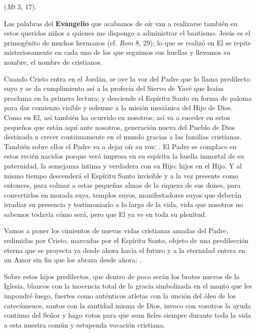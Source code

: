 				\begin{body}
					 (\emph{Mt} 3, 17).
					
					Las palabras del \textbf{Evangelio} que acabamos de oír van a realizarse también en estos queridos niños a quienes me dispongo a administrar el bautismo. Jesús es el primogénito de muchos hermanos (cf. \emph{Rom} 8, 29); lo que se realizó en El se repite misteriosamente en cada uno de los que seguimos sus huellas y llevamos su nombre, el nombre de cristianos.
					
					Cuando Cristo entra en el Jordán, se oye la voz del Padre que lo llama predilecto suyo y se da cumplimiento así a la profecía del Siervo de Yavé que Isaías proclama en la primera lectura; y desciende el Espíritu Santo en forma de paloma para dar comienzo visible y solemne a la misión mesiánica del Hijo de Dios. Como en El, así también ha ocurrido en nosotros; así va a suceder en estos pequeños que están aquí ante nosotros, generación nueva del Pueblo de Dios destinada a crecer continuamente en el mundo gracias a las familias cristianas. También sobre ellos el Padre va a dejar oír su voz: . El Padre se complace en estos recién nacidos porque verá impresa en su espíritu la huella inmortal de su paternidad, la semejanza íntima y verdadera con su Hijo: hijos en el Hijo. Y al mismo tiempo descenderá el Espíritu Santo invisible y a la vez presente como entonces, para colmar a estas pequeñas almas de la riqueza de sus dones, para convertirlos en morada suya, templos suyos, manifestadores suyos que deberán irradiar su presencia y testimoniarlo a lo largo de la vida, vida que nosotros no sabemos todavía cómo será, pero que El ya ve en toda su plenitud.
					
					Vamos a poner los cimientos de nuevas vidas cristianas amadas del Padre, redimidas por Cristo, marcadas por el Espíritu Santo, objeto de una predilección eterna que se proyecta ya desde ahora hacia el futuro y a la eternidad entera en un Amor sin fin que los abraza desde ahora: .
					
					Sobre estos hijos predilectos, que dentro de poco serán los brotes nuevos de la Iglesia, blancos con la inocencia total de la gracia simbolizada en el manto que les impondré luego, fuertes como auténticos atletas con la unción del óleo de los catecúmenos, santos con la santidad misma de Dios, invoco con vosotros la ayuda continua del Señor y hago votos para que sean fieles siempre durante toda la vida a esta nuestra común y estupenda vocación cristiana.
					

\end{body}
